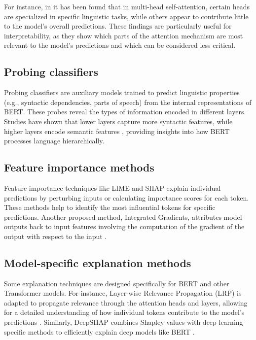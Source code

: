 \documentclass[11pt,a4paper,reqno]{amsart} %
\theoremstyle{definition}
\numberwithin{equation}{section}          %
\begin{document}
For instance, in \cite{voita2019} it has been found that in multi-head self-attention, certain heads are specialized in specific linguistic tasks, while others appear to contribute little to the model’s overall predictions. These findings are particularly useful for interpretability, as they show which parts of the attention mechanism are most relevant to the model’s predictions and which can be considered less critical.

\subsection{Probing classifiers}
Probing classifiers are auxiliary models trained to predict linguistic properties (e.g., syntactic dependencies, parts of speech) from the internal representations of BERT. These probes reveal the types of information encoded in different layers. Studies have shown that lower layers capture more syntactic features, while higher layers encode semantic features \cite{tenney2019}, providing insights into how BERT processes language hierarchically.

\subsection{Feature importance methods}
Feature importance techniques like LIME \cite{ribeiro2016} and SHAP \cite{lundberg2017} explain individual predictions by perturbing inputs or calculating importance scores for each token. These methods help to identify the most influential tokens for specific predictions. Another proposed method, Integrated Gradients, attributes model outputs back to input features involving the computation of the gradient of the output with respect to the input \cite{sundararajan2017}.

\subsection{Model-specific explanation methods}
Some explanation techniques are designed specifically for BERT and other Transformer models. For instance, Layer-wise Relevance Propagation (LRP) is adapted to propagate relevance through the attention heads and layers, allowing for a detailed understanding of how individual tokens contribute to the model's predictions \cite{voita2019}. Similarly, DeepSHAP combines Shapley values with deep learning-specific methods to efficiently explain deep models like BERT \cite{lundberg2017}.
\end{document}
